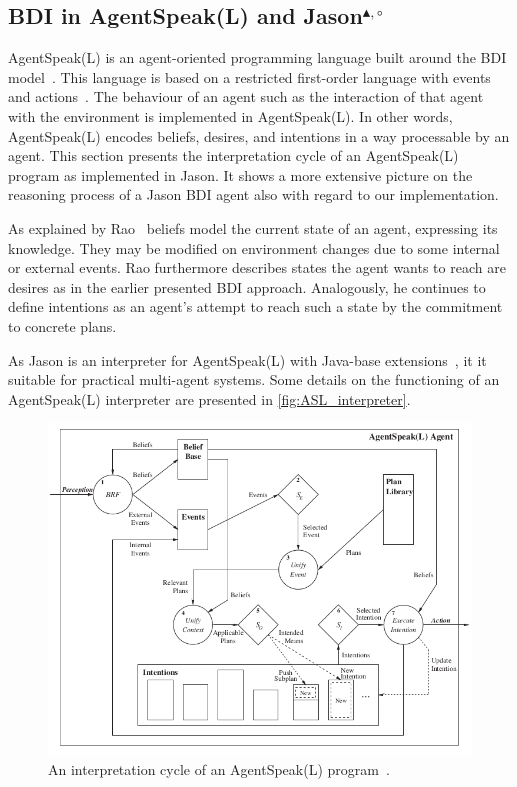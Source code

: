\subsection[BDI in AgentSpeak(L) and Jason]{BDI in AgentSpeak(L) and Jason$^{\blacktriangle,\circ}$}
AgentSpeak(L) is an agent-oriented programming language built around the BDI model~\cite{rafael_BDIAgent_2005}.
This language is based on a restricted first-order language with events and actions~\cite{anand_AgentSpeak_1996}.
The behaviour of an agent such as the interaction of that agent with the environment is implemented in AgentSpeak(L).
In other words, AgentSpeak(L) encodes beliefs, desires, and intentions in a way processable by an agent.
This section presents the interpretation cycle of an AgentSpeak(L) program as implemented in Jason.
It shows a more extensive picture on the reasoning process of a Jason BDI agent also with regard to our implementation.

As explained by Rao~\cite{anand_AgentSpeak_1996} beliefs model the current state of an agent, expressing its knowledge.
They may be modified on environment changes due to some internal or external events.
Rao furthermore describes states the agent wants to reach are desires as in the earlier presented BDI approach.
Analogously, he continues to define intentions as an agent's attempt to reach such a state by the commitment to concrete plans.

As Jason is an interpreter for AgentSpeak(L) with Java-base extensions~\cite{rafael_Javabased}, it it suitable for practical multi-agent systems.
Some details on the functioning of an AgentSpeak(L) interpreter are presented in \autoref{fig:ASL_interpreter}.
\begin{figure}[h]
  \centering
  \includegraphics[width=\textwidth]{images/BDI_ASL_interpreter}
  \caption{An interpretation cycle of an AgentSpeak(L) program~\cite{rafael_BDIAgent_2005}.}
  \label{fig:ASL_interpreter}
\end{figure}

